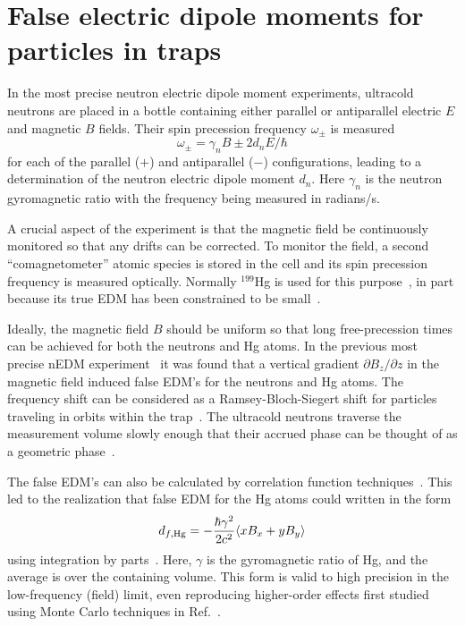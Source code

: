 \documentclass[preprint,12pt]{elsarticle}
\begin{document}

\section{False electric dipole moments for particles in traps}
\label{sec:intro}

In the most precise neutron electric dipole moment experiments,
ultracold neutrons are placed in a bottle containing either parallel
or antiparallel electric $E$ and magnetic $B$ fields.  Their spin
precession frequency $\omega_\pm$ is measured
\begin{equation}
\omega_\pm=\gamma_nB\pm 2d_nE/\hbar
\end{equation}
for each of the parallel ($+$) and antiparallel ($-$) configurations,
leading to a determination of the neutron electric dipole moment
$d_n$.  Here $\gamma_n$ is the neutron gyromagnetic ratio with the
frequency being measured in radians/s.

A crucial aspect of the experiment is that the magnetic field be
continuously monitored so that any drifts can be corrected.  To
monitor the field, a second ``comagnetometer'' atomic species is
stored in the cell and its spin precession frequency is measured
optically.  Normally $^{199}$Hg is used for this
purpose~\cite{bib:green,bib:bakernim,bib:hg-better}, in part because
its true EDM has been constrained to be
small~\cite{bib:griffith,bib:hgupdate}.

Ideally, the magnetic field $B$ should be uniform so that long
free-precession times can be achieved for both the neutrons and Hg
atoms.  In the previous most precise nEDM
experiment~\cite{bib:baker,bib:pendlebury} it was found that a
vertical gradient $\partial B_z/\partial z$ in the magnetic field
induced false EDM's for the neutrons and Hg atoms.  The frequency
shift can be considered as a Ramsey-Bloch-Siegert shift for particles
traveling in orbits within the trap~\cite{bib:gpe1,bib:gpe2}.  The
ultracold neutrons traverse the measurement volume slowly enough that
their accrued phase can be thought of as a geometric
phase~\cite{bib:gpe1}.

The false EDM's can also be calculated by correlation function
techniques~\cite{bib:gpe3,bib:gpe4}.  This led to the realization that
false EDM for the Hg atoms could written in the form
\begin{equation}
\label{eq:pignol}
  d_{f,\rm Hg}=-\frac{\hbar\gamma^{2}}{2c^{2}}\langle xB_x+yB_y\rangle
\end{equation}
using integration by parts~\cite{bib:pignol-roccia}.  Here, $\gamma$
is the gyromagnetic ratio of Hg, and the average is over the
containing volume. This form is valid to high precision in the
low-frequency (field) limit, even reproducing higher-order effects
first studied using Monte Carlo techniques in Ref.~\cite{bib:gpe2}.
\end{document}

